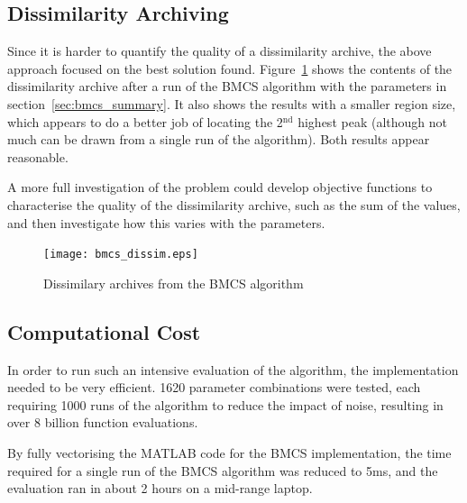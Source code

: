 \documentclass[10pt]{article}
\begin{document}
\subsection{Dissimilarity Archiving}

Since it is harder to quantify the quality of a dissimilarity archive, the
above approach focused on the best solution found.
Figure~\ref{fig:bmcs_dissim} shows the contents of the dissimilarity archive
after a run of the BMCS algorithm with the parameters in
section~\ref{sec:bmcs_summary}. It also shows the results with a smaller
region size, which appears to do a better job of locating the
2$^\textrm{nd}$ highest peak (although not much can be drawn from a single
run of the algorithm). Both results appear reasonable.

A more full investigation of the problem could develop objective
functions to characterise the quality of the dissimilarity archive, such as
the sum of the values, and then investigate how this varies with the
parameters.

\begin{figure}
  \begin{center}
    \texttt{[image: bmcs\_dissim.eps]}
    \end{center}
    \caption{Dissimilary archives from the BMCS algorithm}
    \label{fig:bmcs_dissim}
    \end{figure}

\subsection{Computational Cost}

In order to run such an intensive evaluation of the algorithm, the
implementation needed to be very efficient. 1620 parameter combinations were
tested, each requiring 1000 runs of the algorithm to reduce the impact of
noise, resulting in over 8 billion function evaluations.

By fully vectorising the MATLAB code for the BMCS implementation, the time
required for a single run of the BMCS algorithm was reduced to 5ms, and the
evaluation ran in about 2 hours on a mid-range laptop.
\end{document}
